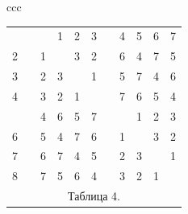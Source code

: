 \begin{center}
\begin{tabular}{ccc}
\begin{tabular}{ccccccccccc}
\hline


 1 & \vline & \ & 1 & 2 & 3 & \vline & 4 & 5 & 6 & 7 \\


2 & \vline & 1 & \ & 3 & 2 & \vline & 6 & 4 & 7 & 5 \\


3 & \vline & 2 & 3 & \ & 1 & \vline & 5 & 7 & 4 & 6 \\


4 & \vline & 3 & 2 & 1 & \ & \vline & 7 & 6 & 5 & 4 \\


\hline


 5 & \vline & 4 & 6 & 5 & 7 & \vline & \ & 1 & 2 & 3 \\


6 & \vline & 5 & 4 & 7 & 6 & \vline & 1 & \ & 3 & 2 \\


7 & \vline & 6 & 7 & 4 & 5 & \vline & 2 & 3 & \ & 1 \\


8 & \vline & 7 & 5 & 6 & 4 & \vline & 3 & 2 & 1 & \ \\


\multicolumn{11}{c}{ Таблица 4.}


\end{tabular}





\end{tabular}


\end{center}








